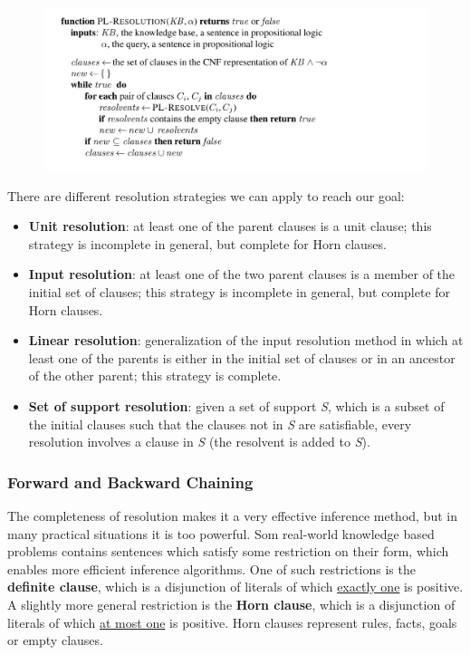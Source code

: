 \documentclass{article}
\begin{document}
\begin{figure}[h]
    \centering
    \includegraphics[width=1\linewidth]{algorithms/PL Resolution.png}
    \label{fig:PL_resolution}
\end{figure}

\noindent
There are different resolution strategies we can apply to reach our goal:
\begin{itemize}
    \item \textbf{Unit resolution}: at least one of the parent clauses is a unit clause; this strategy is incomplete in general, but complete for Horn clauses.
    \item \textbf{Input resolution}: at least one of the two parent clauses is a member of the initial set of clauses; this strategy is incomplete in general, but complete for Horn clauses.
    \item \textbf{Linear resolution}: generalization of the input resolution method in which at least one of the parents is either in the initial set of clauses or in an ancestor of the other parent; this strategy is complete.
    \item \textbf{Set of support resolution}: given a set of support \textit{S}, which is a subset of the initial clauses such that the clauses not in \textit{S} are satisfiable, every resolution involves a clause in \textit{S} (the resolvent is added to \textit{S}).
\end{itemize}

\subsubsection{Forward and Backward Chaining}
The completeness of resolution makes it a very effective inference method, but in many practical situations it is too powerful. Som real-world knowledge based problems contains sentences which satisfy some restriction on their form, which enables more efficient inference algorithms. One of such restrictions is the \textbf{definite clause}, which is a disjunction of literals of which \underline{exactly one} is positive. A slightly more general restriction is the \textbf{Horn clause}, which is a disjunction of literals of which \underline{at most one} is positive. Horn clauses represent rules, facts, goals or empty clauses.
\end{document}

